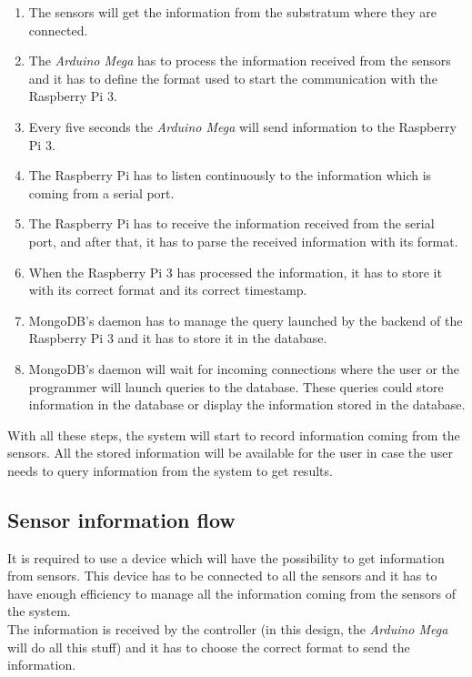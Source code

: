 \begin{enumerate}

\item The sensors will get the information from the substratum where they are connected.
\item The \textit{Arduino Mega} has to process the information received from the sensors and it has to define the format used to start the communication with the Raspberry Pi 3.
\item Every five seconds the \textit{Arduino Mega} will send information to the Raspberry Pi 3.
\item The Raspberry Pi has to listen continuously to the information which is coming from a serial port.
\item The Raspberry Pi has to receive the information received from the serial port, and after that, it has to parse the received information with its format.
\item When the Raspberry Pi 3 has processed the information, it has to store it with its correct format and its correct timestamp.
\item MongoDB's \cite{mongodb, pymongo} daemon has to manage the query launched by the backend of the Raspberry Pi 3 and it has to store it in the database.
\item MongoDB's daemon will wait for incoming connections where the user or the programmer will launch queries to the database. These queries could store information in the database or display the information stored in the database.
\end{enumerate}

With all these steps, the system will start to record information coming from the sensors. All the stored information will be available for the user in case the user needs to query information from the system to get results.

\subsection{Sensor information flow}

It is required to use a device which will have the possibility to get information from sensors. This device has to be connected to all the sensors and it has to have enough efficiency to manage all the information coming from the sensors of the system.\\ 

The information is received by the controller (in this design, the \textit{Arduino Mega} will do all this stuff) and it has to choose the correct format to send the information.\\

